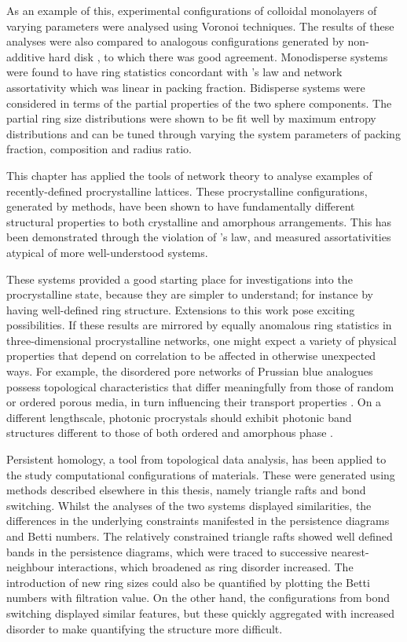 As an example of this, experimental configurations of \qtd{} colloidal monolayers of varying parameters were analysed using Voronoi techniques.
The results of these analyses were also compared to analogous configurations generated by non\--additive hard disk \mc{}, to which there was good agreement.
Monodisperse systems were found to have ring statistics concordant with \lm's law and network assortativity which was linear in packing fraction.
Bidisperse systems were considered in terms of the partial properties of the two sphere components.
The partial ring size distributions were shown to be fit well by maximum entropy distributions and can be tuned through varying the system parameters of packing fraction, composition and radius ratio.




This chapter has applied the tools of network theory to analyse \td{} examples of recently\--defined procrystalline lattices.
These procrystalline configurations, generated by \mc{} methods, have been shown to have fundamentally different structural properties to both crystalline and amorphous arrangements.
This has been demonstrated through the violation of \lm's law, and measured assortativities atypical of more well\--understood systems.

These \td{} systems provided a good starting place for investigations into the procrystalline state, because they are simpler to understand; for instance by having well\--defined ring structure.
Extensions to this work pose exciting possibilities.
If these results are mirrored by equally anomalous ring statistics in three\--dimensional procrystalline networks, one might expect a variety of physical properties that depend on correlation to be affected in otherwise unexpected ways. 
For example, the disordered pore networks of Prussian blue analogues possess topological characteristics that differ meaningfully from those of random or ordered porous media, in turn influencing their transport properties \cite{Simonov2020}.
On a different lengthscale, photonic procrystals should exhibit photonic band structures different to those of both ordered and amorphous phase \cite{Florescu2009,Sellers2017}.




Persistent homology, a tool from topological data analysis, has been applied to the study computational configurations of \td{} materials.
These were generated using methods described elsewhere in this thesis, namely triangle rafts and bond switching.
Whilst the analyses of the two systems displayed similarities, the differences in the underlying constraints manifested in the persistence diagrams and Betti numbers.
The relatively constrained triangle rafts showed well defined bands in the persistence diagrams, which were traced to successive nearest\--neighbour interactions, which broadened as ring disorder increased.
The introduction of new ring sizes could also be quantified by plotting the Betti numbers with filtration value.
On the other hand, the configurations from bond switching displayed similar features, but these quickly aggregated with increased disorder to make quantifying the structure more difficult.

